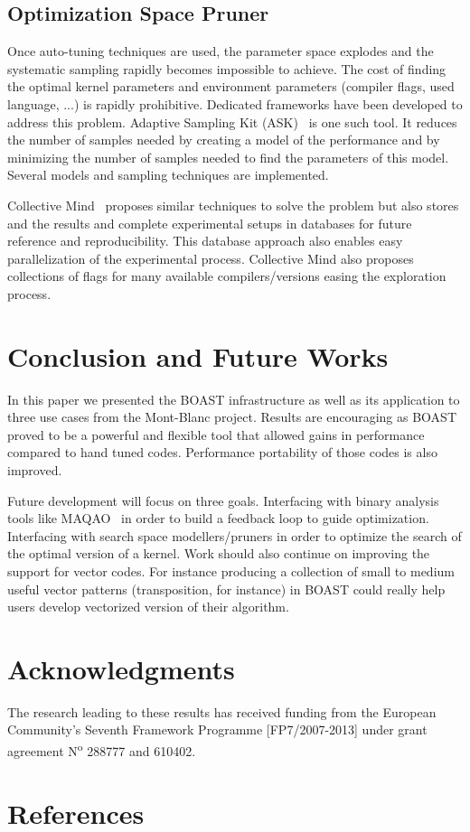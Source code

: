 \documentclass{IEEEtran}
\newcommand*{\Num}{N\textsuperscript{o}\xspace}
\begin{document}
  \subsection{Optimization Space Pruner}

  Once auto-tuning techniques are used, the parameter space explodes and the
systematic sampling rapidly becomes impossible to achieve. The cost of finding
the optimal kernel parameters and environment parameters (compiler flags, used
language, ...) is rapidly prohibitive. Dedicated frameworks have been developed
to address this problem. Adaptive Sampling Kit (ASK)~\cite{castro2013adaptive}
is one such tool. It reduces the number of samples needed by creating a model of
the performance and by minimizing the number of samples needed to find the
parameters of this model. Several models and sampling techniques are
implemented.

  Collective Mind~\cite{fursin:hal-01054763} proposes similar techniques to
solve the problem but also stores and the results and complete experimental
setups in databases for future reference and reproducibility. This database
approach also enables easy parallelization of the experimental process.
Collective Mind also proposes collections of flags for many available
compilers/versions easing the exploration process.

\section{Conclusion and Future Works}

In this paper we presented the BOAST infrastructure as well as its application
to three use cases from the Mont-Blanc project. Results are encouraging as
BOAST proved to be a powerful and flexible tool that allowed gains in
performance compared to hand tuned codes. Performance portability of those
codes is also improved.

Future development will focus on three goals. Interfacing with binary analysis
tools like MAQAO~\cite{djoudi2005exploring} in order to build a feedback loop
to guide optimization. Interfacing with search space modellers/pruners in order
to optimize the search of the optimal version of a kernel. Work should also
continue on improving the support for vector codes. For instance producing a
collection of small to medium useful vector patterns (transposition, for
instance) in BOAST could really help users develop vectorized version of their
algorithm.

\section*{Acknowledgments}

The research leading to these results has received funding from the European
Community's Seventh Framework Programme [FP7/2007-2013] under grant agreement
\Num 288777 and 610402.

\section*{References}


\end{document}
